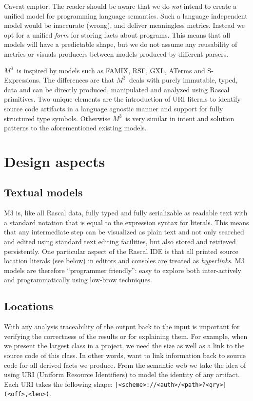 \documentclass[a4]{IEEEtran}
\newcommand{\loc}[1]{\small{\texttt{#1}}}
\newcommand{\mthree}{\ensuremath{M^3}}
\begin{document}
Caveat emptor. The reader should be aware that we do \emph{not} intend to create a unified model for programming language semantics. Such a language independent model would be inaccurate (wrong), and deliver meaningless metrics. Instead we opt for a unified \emph{form} for storing facts about programs. This means that all models will have a predictable shape, but we do not assume any reusability of metrics or visuals producers between models produced by different parsers. 

\mthree\ is inspired by models such as FAMIX, RSF, GXL, ATerms and S-Expressions. The differences are that \mthree\ deals with purely immutable, typed, data and can be directly produced, manipulated and analyzed using Rascal primitives. Two unique elements are the introduction of URI literals to identify source code artifacts in a language agnostic manner and support for fully structured type symbols. Otherwise \mthree\  is very similar in intent and solution patterns to the aforementioned existing models.

\section{Design aspects}

\subsection{Textual models}

M3 is, like all Rascal data, fully typed and fully serializable as readable text with a standard notation that is equal to the expression syntax for literals. This means that any intermediate step can be visualized as plain text and not only searched and edited using standard text editing facilities, but also stored and retrieved persistently. One particular aspect of the Rascal IDE is that all printed source location literals (see below) in editors and consoles are treated as \emph{hyperlinks}. M3 models are therefore ``programmer friendly'': easy to explore both inter-actively and programmatically using low-brow techniques.

\subsection{Locations} 

With any analysis traceability of the output back to the input is important for verifying the correctness of the results or for explaining them. For example, when we present the largest class in a project, we need the size as well as a link to the source code of this class. In other words, want to link information back to source code for all derived facts we produce. From the semantic web we take the idea of using URI (Uniform Resource Identifiers) to model the identity of any artifact. Each URI takes the following shape: \loc{|<scheme>://<auth>/<path>?<qry>|(<off>,<len>)}.
\end{document}
